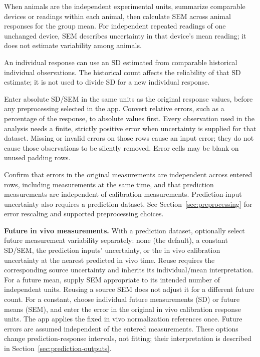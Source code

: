When animals are the independent experimental units, summarize comparable devices or readings within each animal, then calculate SEM across animal responses for the group mean. For independent repeated readings of one unchanged device, SEM describes uncertainty in that device's mean reading; it does not estimate variability among animals.

An individual response can use an SD estimated from comparable historical individual observations. The historical count affects the reliability of that SD estimate; it is not used to divide SD for a new individual response.

Enter absolute SD/SEM in the same units as the original response values, before any preprocessing selected in the app. Convert relative errors, such as a percentage of the response, to absolute values first. Every observation used in the analysis needs a finite, strictly positive error when uncertainty is supplied for that dataset. Missing or invalid errors on those rows cause an input error; they do not cause those observations to be silently removed. Error cells may be blank on unused padding rows.

Confirm that errors in the original measurements are independent across entered rows, including measurements at the same time, and that prediction measurements are independent of calibration measurements. Prediction-input uncertainty also requires a prediction dataset. See Section~\ref{sec:preprocessing} for error rescaling and supported preprocessing choices.

\textbf{Future in vivo measurements.} With a prediction dataset, optionally select future measurement variability separately: none (the default), a constant SD/SEM, the prediction inputs' uncertainty, or the in vivo calibration uncertainty at the nearest predicted in vivo time. Reuse requires the corresponding source uncertainty and inherits its individual/mean interpretation. For a future mean, supply SEM appropriate to its intended number of independent units. Reusing a source SEM does not adjust it for a different future count. For a constant, choose individual future measurements (SD) or future means (SEM), and enter the error in the original in vivo calibration response units. The app applies the fixed in vivo normalization references once. Future errors are assumed independent of the entered measurements. These options change prediction-response intervals, not fitting; their interpretation is described in Section~\ref{sec:prediction-outputs}.

